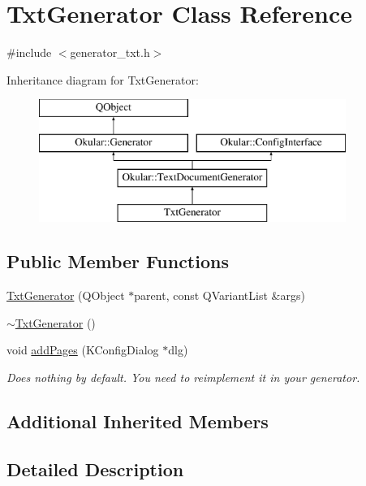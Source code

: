 \hypertarget{classTxtGenerator}{\section{Txt\+Generator Class Reference}
\label{classTxtGenerator}
}


{\ttfamily \#include $<$generator\+\_\+txt.\+h$>$}

Inheritance diagram for Txt\+Generator\+:\begin{figure}[H]
\begin{center}
\leavevmode
\includegraphics[height=4.000000cm]{classTxtGenerator}
\end{center}
\end{figure}
\subsection*{Public Member Functions}
\begin{DoxyCompactItemize}
\item 
\hyperlink{classTxtGenerator_a2e2232886ae1224c90d98bdf59b17ea2}{Txt\+Generator} (Q\+Object $\ast$parent, const Q\+Variant\+List \&args)
\item 
\hyperlink{classTxtGenerator_ad0239a3251d0b83a38adcea59cc06472}{$\sim$\+Txt\+Generator} ()
\item 
void \hyperlink{classTxtGenerator_a30036a27058c18c3ce000e682ae2cb8c}{add\+Pages} (K\+Config\+Dialog $\ast$dlg)
\begin{DoxyCompactList}\small\item\em Does nothing by default. You need to reimplement it in your generator. \end{DoxyCompactList}\end{DoxyCompactItemize}
\subsection*{Additional Inherited Members}


\subsection{Detailed Description}


